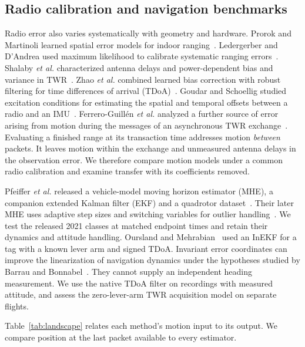 \documentclass{IEEEtaes}
\begin{document}
\subsection{Radio calibration and navigation benchmarks}
Radio error also varies systematically with geometry and hardware. Prorok and Martinoli learned spatial error models for indoor ranging~\cite{prorok}. Ledergerber and D'Andrea used maximum likelihood to calibrate systematic ranging errors~\cite{ledergerber}. Shalaby \emph{et al.} characterized antenna delays and power-dependent bias and variance in TWR~\cite{shalaby}. Zhao \emph{et al.} combined learned bias correction with robust filtering for time differences of arrival (TDoA)~\cite{zhao}. Goudar and Schoellig studied excitation conditions for estimating the spatial and temporal offsets between a radio and an IMU~\cite{goudarcal}. Ferrero-Guill\'en \emph{et al.} analyzed a further source of error arising from motion during the messages of an asynchronous TWR exchange~\cite{motiontwr}. Evaluating a finished range at its transaction time addresses motion \emph{between} packets. It leaves motion within the exchange and unmeasured antenna delays in the observation error. We therefore compare motion models under a common radio calibration and examine transfer with its coefficients removed.

Pfeiffer \emph{et al.} released a vehicle-model moving horizon estimator (MHE), a companion extended Kalman filter (EKF) and a quadrotor dataset~\cite{pfeiffer,delftdata}. Their later MHE uses adaptive step sizes and switching variables for outlier handling~\cite{pfeiffer25}. We test the released 2021 classes at matched endpoint times and retain their dynamics and attitude handling. Oursland and Mehrabian~\cite{oursland} used an InEKF for a tag with a known lever arm and signed TDoA. Invariant error coordinates can improve the linearization of navigation dynamics under the hypotheses studied by Barrau and Bonnabel~\cite{barrau}. They cannot supply an independent heading measurement. We use the native TDoA filter on recordings with measured attitude, and assess the zero-lever-arm TWR acquisition model on separate flights.

Table~\ref{tab:landscape} relates each method's motion input to its output. We compare position at the last packet available to every estimator.
\end{document}
